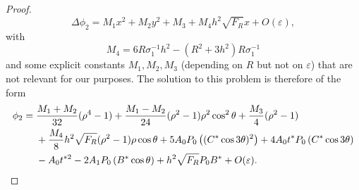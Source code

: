 \documentclass[12pt,reqno]{amsart}
\numberwithin{equation}{section}
\theoremstyle{definition}
\theoremstyle{remark}
\begin{document}
\begin{proof}
\begin{equation*}%
\Delta\phi_2=M_1x^2+M_2y^2+M_3+M_4h^2\sqrt{F_R}x+O(\varepsilon),
\end{equation*}
with $$ M_4=6R\sigma_1^{-1}h^2-(R^2+3h^2)R\sigma_1^{-1} $$ and some explicit constants $M_1, M_2, M_3$ (depending on $R$ but not on $\varepsilon$) that are not relevant for our purposes.  
The solution to this problem is therefore of the form
\begin{align*}%
\phi_2={}&\frac{M_1+M_2}{32}(\rho^4-1)
+\frac{M_1-M_2}{24}(\rho^2-1)\rho^2\cos^2\theta
+\frac{M_3}{4}(\rho^2-1)\notag\\
& +\frac{M_4}{8}h^2\sqrt{F_R}(\rho^2-1)\rho\cos\theta+ 5A_0P_0\left( (C^*\cos3\theta)^2\right)+4A_0t^* P_0\left(C^*\cos3\theta\right)\notag\\
&   -A_0t^{*2}-2A_1P_0\left(B^*\cos\theta\right) +h^2\sqrt{F_R}P_0 B^*   +O(\varepsilon).
\end{align*}


\end{proof}
\end{document}
